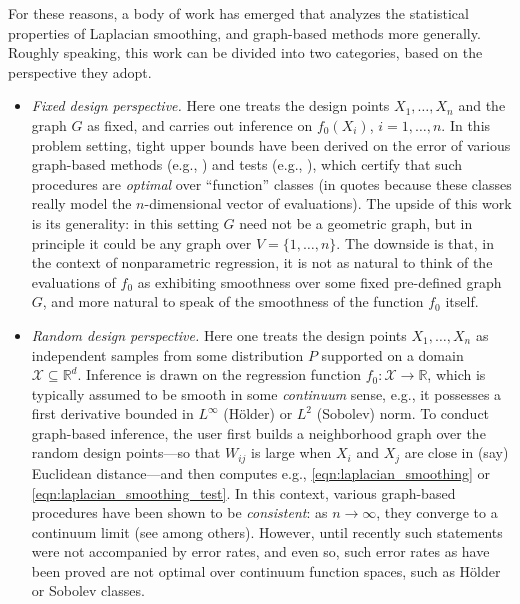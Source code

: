 \documentclass[twoside]{article}
\newcommand{\Reals}{\mathbb{R}}
\newcommand{\1}{\mathbf{1}}
\newcommand{\Rd}{\Reals^d}
\newcommand{\Xset}{\mathcal{X}}
\newcommand{\Leb}{L}
\theoremstyle{definition}
\theoremstyle{remark}
\begin{document}
For these reasons, a body of work has emerged that analyzes the statistical properties of Laplacian smoothing, and graph-based methods more generally. Roughly speaking, this work can be divided into two categories, based on the perspective they adopt. 
\begin{itemize}
	\item \emph{Fixed design perspective.} Here one treats the design points $X_1,\ldots,X_n$ and the graph $G$ as fixed, and carries out inference on $f_0(X_i)$, $i=1,\ldots,n$. In this problem setting, tight upper bounds have been derived on the error of various graph-based methods (e.g., \citet{wang2016,hutter2016,sadhanala16,sadhanala17,kirichenko2017,kirichenko2018}) and tests (e.g., \citet{sharpnack2010identifying,sharpnack2013b,sharpnack2013,sharpnack2015}), which certify that such procedures are \emph{optimal} over ``function'' classes (in quotes because these classes really model the $n$-dimensional vector of evaluations). The upside of this work is its generality: in this setting $G$ need not be a geometric graph, but in principle it could be any graph over $V=\{1,\ldots,n\}$. The downside is that, in the context of nonparametric regression, it is not as natural to think of the evaluations of $f_0$ as exhibiting smoothness over some fixed pre-defined graph $G$, and more natural to speak of the smoothness of the function $f_0$ itself. 
	\item \emph{Random design perspective.} Here one treats the design points $X_1,\ldots,X_n$ as independent samples from some distribution $P$ supported on a domain $\Xset \subseteq \Rd$. Inference is drawn on the regression function $f_0: \Xset \to \Reals$, which is typically assumed to be smooth in some \emph{continuum} sense, e.g., it possesses a first derivative bounded in $L^{\infty}$ (H\"{o}lder) or $\Leb^2$ (Sobolev) norm. To conduct graph-based inference, the user first builds a neighborhood graph over the random design points---so that $W_{ij}$ is large when $X_i$ and $X_j$ are close in (say) Euclidean distance---and then computes e.g., \eqref{eqn:laplacian_smoothing} or \eqref{eqn:laplacian_smoothing_test}. In this context, various graph-based procedures have been shown to be \emph{consistent}: as $n \to \infty$, they converge to a continuum limit (see \citet{belkin07,vonluxburg2008,trillos2018} among others). However, until recently such statements were not accompanied by error rates, and even so, such error rates as have been proved \citep{lee2016,trillos2020} are not optimal over continuum function spaces, such as H\"{o}lder or Sobolev classes. 
\end{itemize}
\end{document}
